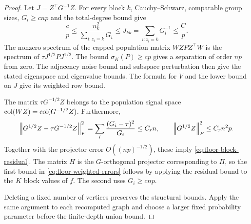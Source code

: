 \begin{proof}
Let $J=Z^\top G^{-1}Z$. For every block $k$, Cauchy--Schwarz,
comparable group sizes, $G_i\ge c{np}$ and the total-degree bound give
\[
 \frac{c}{p}\le
 \frac{n_k^2}{\sum_{i:z_i=k}G_i}
 \le J_{kk}=\sum_{i:z_i=k}G_i^{-1}\le\frac{C}{p}.
\]
The nonzero spectrum of the capped population matrix $W{ZPZ^\top} W$ is
the spectrum of $\tau J^{1/2}PJ^{1/2}$. The bound
$\sigma_K(P)\ge c p$ gives a separation of order ${np}$ from zero.
The adjacency noise bound and
subspace perturbation then give the stated eigenspace and eigenvalue
bounds. The formula for $V$
and the lower bound on $J$ give its weighted row bound.

The matrix $\tau G^{-1/2}Z$ belongs to the population signal space
$\operatorname{col}(WZ)=\operatorname{col}(G^{-1/2}Z)$. Furthermore,
\[
 \left\lVert G^{1/2}Z-\tau G^{-1/2}Z\right\rVert_F^2
 =\sum_i\frac{(G_i-\tau)^2}{G_i}\le C_rn,
 \qquad \left\lVert G^{1/2}Z\right\rVert_F^2\le C_r{n^2p}.
\]
Together with the projector error $O({(np)}^{-1/2})$, these imply
\eqref{eq:floor-block-residual}. The matrix $H$ is the
$G$-orthogonal projector corresponding to $\Pi$, so the first bound
in \eqref{eq:floor-weighted-errors} follows by applying the residual bound to the $K$ block values of $f$.
The second uses $G_i\ge c{np}$.

Deleting a fixed number of vertices preserves the structural bounds.
Apply the same argument to each recomputed graph and choose a larger
fixed probability parameter before the finite-depth union bound.
\end{proof}
